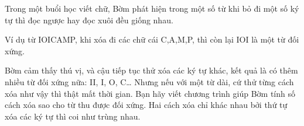 Trong một buổi học viết chữ, Bờm phát hiện trong một số từ khi bỏ đi một số ký tự thì đọc ngược hay đọc xuôi đều giống nhau.  

   Ví dụ từ IOICAMP, khi xóa đi các chữ cái C,A,M,P, thì còn lại IOI là một từ đối xứng.  

   Bờm cảm thấy thú vị, và cậu tiếp tục thử xóa các ký tự khác, kết quả là có thêm nhiều từ đối xứng nữa: II, I, O, C… Nhưng nếu với một từ dài, cứ thử từng cách xóa như vậy thì thật mất thời gian. Bạn hãy viết chương trình giúp Bờm tính số cách xóa sao cho từ thu được đối xứng. Hai cách xóa chỉ khác nhau bởi thứ tự xóa các ký tự thì coi như trùng nhau.